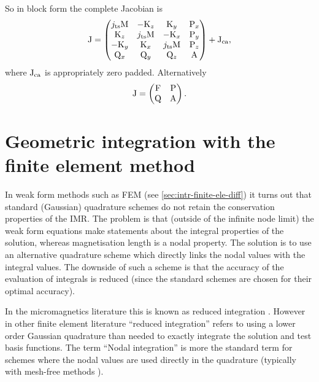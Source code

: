 So in block form the complete Jacobian is
\begin{equation}
  \mathrm{J} =
  \begin{pmatrix}
    j_\mathrm{ts} \mathrm{M}    & -\mathrm{K}_z       & \mathrm{K}_y      & \mathrm{P}_x \\
    \mathrm{K}_z         & j_\mathrm{ts}\mathrm{M}    & -\mathrm{K}_x     & \mathrm{P}_y \\
    -\mathrm{K}_y        & \mathrm{K}_x      & j_\mathrm{ts} \mathrm{M} & \mathrm{P}_z \\
    \mathrm{Q}_x       & \mathrm{Q}_y      & \mathrm{Q}_z    & \mathrm{A}     \\
  \end{pmatrix} + \mathrm{J}_\mathrm{ca},
\end{equation}
where $\mathrm{J}_\mathrm{ca}$ is appropriately zero padded.
Alternatively
\begin{equation}
\mathrm{J} =
  \begin{pmatrix}
    \mathrm{F}   & \mathrm{P} \\
    \mathrm{Q}   & \mathrm{A} \\
  \end{pmatrix}.
\end{equation}



\section{Geometric integration with the finite element method}
\label{sec:nodal-integration}

In weak form methods such as FEM (see \cref{sec:intr-finite-ele-diff}) it turns out that standard (\ie Gaussian) quadrature schemes do not retain the conservation properties of the IMR.
The problem is that (outside of the infinite node limit) the weak form equations make statements about the integral properties of the solution, whereas magnetisation length is a nodal property.
The solution is to use an alternative quadrature scheme which directly links the nodal values with the integral values.
The downside of such a scheme is that the accuracy of the evaluation of integrals is reduced (since the standard schemes are chosen for their optimal accuracy).

In the micromagnetics literature this is known as reduced integration \cite{Cimrak2008}.
However in other finite element literature ``reduced integration'' refers to using a lower order Gaussian quadrature than needed to exactly integrate the solution and test basis functions.
The term ``Nodal integration'' is more the standard term for schemes where the nodal values are used directly in the quadrature (typically with mesh-free methods \eg \cite{Puso2008}).

